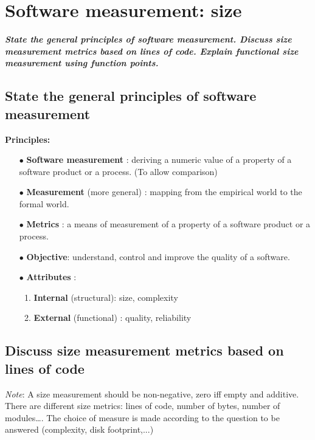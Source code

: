\documentclass{article}
\begin{document}
\newpage
\section{Software measurement: size}
\textbf{\textit{State the general principles of software measurement. Discuss size measurement metrics based on lines of code. Explain functional size measurement using function points.}}

\subsection{State the general principles of software measurement}
\noindent \textbf{Principles:}
\begin{itemize}
    \item [$\bullet$]\textbf{Software measurement} : deriving a numeric value of a property of a software product or a process. (To allow comparison)
    \item [$\bullet$]\textbf{Measurement} (more general) : mapping from the empirical world to the formal world.
    \item [$\bullet$]\textbf{Metrics} : a means of measurement of a property of a software product or a process.
    \item [$\bullet$]\textbf{Objective}: understand, control and improve the quality of a software.
    \item [$\bullet$]\textbf{Attributes} :
    \begin{enumerate}
        \item \textbf{Internal} (structural): size, complexity
        \item \textbf{External} (functional) : quality, reliability
    \end{enumerate}
\end{itemize}

\subsection{Discuss size measurement metrics based on lines of code}
\noindent \textit{Note}: A size measurement should be non-negative, zero iff empty and additive.\\

\noindent There are different size metrics: lines of code, number of bytes, number of modules…. The choice of measure is made according to the question to be answered (complexity, disk footprint,...)\\
\end{document}

